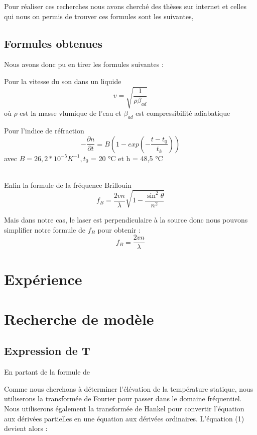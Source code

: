 \documentclass{rapportECC}
\begin{document}
Pour réaliser ces recherches nous avons cherché des thèses sur internet et celles qui nous on permis de trouver ces formules sont les suivantes,


\subsection{Formules obtenues}

Nous avons donc pu en tirer les formules suivantes :

Pour la vitesse du son dans un liquide
\begin{equation}
    v = \sqrt{\frac{1}{\rho \beta_{ad}}}
\end{equation}
où $\rho$ est la masse vlumique de l'eau et $\beta_{ad}$ est compressibilité adiabatique

Pour l'indice de réfraction 
\begin{equation}
    -\frac{\partial n}{\partial t} = B(1-exp(-\frac{t-t_0}{t_k}))
\end{equation}
avec $B=26,2*10^{-5} K^{-1}, t_0$ = 20 °C et h = 48,5 °C

\\
Enfin la formule de la fréquence Brillouin
\begin{equation}
    f_B = \frac{2vn}{\lambda}\sqrt{1-\frac{\sin^2{\theta}}{n^2}}
\end{equation}

Mais dans notre cas, le laser est perpendiculaire à la source donc nous pouvons simplifier notre formule de $f_B$ pour obtenir :
\begin{equation}
    f_B =  \frac{2vn}{\lambda}
\end{equation}

\section{Expérience}

\section{Recherche de modèle}

\subsection{Expression de T}

En partant de la formule de 

Comme nous cherchons à déterminer l’élévation de la température statique,
nous utiliserons la transformée de Fourier pour passer dans le domaine
fréquentiel. Nous utiliserons également la transformée de Hankel pour convertir
l’équation aux dérivées partielles en une équation aux dérivées ordinaires.
L’équation (1) devient alors :
\end{document}
